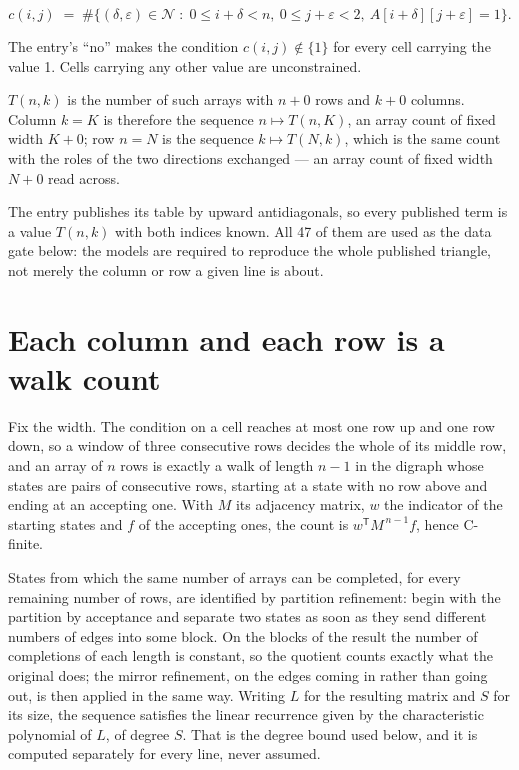 \documentclass[11pt]{article}
\theoremstyle{definition}
\begin{document}
\[c(i,j) \;=\; \#\bigl\{(\delta,\varepsilon)\in\mathcal{N} \;:\; 0\le i+\delta<n,\ 0\le j+\varepsilon<2,\ A[i+\delta][j+\varepsilon] = 1\bigr\}.\]

The entry's ``no'' makes the condition $c(i,j) \notin \{1\}$ for every cell carrying the value 1. Cells carrying any other value are unconstrained.

$T(n,k)$ is the number of such arrays with $n + 0$ rows and $k + 0$ columns. Column $k = K$ is therefore the sequence $n \mapsto T(n,K)$, an array count of fixed width $K + 0$; row $n = N$ is the sequence $k \mapsto T(N,k)$, which is the same count with the roles of the two directions exchanged --- an array count of fixed width $N + 0$ read across.

The entry publishes its table by upward antidiagonals, so every published term is a value $T(n,k)$ with both indices known. All 47 of them are used as the data gate below: the models are required to reproduce the whole published triangle, not merely the column or row a given line is about.

\section{Each column and each row is a walk count}

Fix the width. The condition on a cell reaches at most one row up and one row down, so a window of three consecutive rows decides the whole of its middle row, and an array of $n$ rows is exactly a walk of length $n-1$ in the digraph whose states are pairs of consecutive rows, starting at a state with no row above and ending at an accepting one. With $M$ its adjacency matrix, $w$ the indicator of the starting states and $f$ of the accepting ones, the count is $w^{\mathsf T}M^{\,n-1}f$, hence C-finite.

States from which the same number of arrays can be completed, for every remaining number of rows, are identified by partition refinement: begin with the partition by acceptance and separate two states as soon as they send different numbers of edges into some block. On the blocks of the result the number of completions of each length is constant, so the quotient counts exactly what the original does; the mirror refinement, on the edges coming in rather than going out, is then applied in the same way. Writing $L$ for the resulting matrix and $S$ for its size, the sequence satisfies the linear recurrence given by the characteristic polynomial of $L$, of degree $S$. That is the degree bound used below, and it is computed separately for every line, never assumed.
\end{document}

